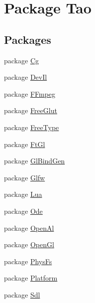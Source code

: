 \hypertarget{namespace_tao}{
\section{Package Tao}
\label{namespace_tao}
}
\subsection*{Packages}
\begin{DoxyCompactItemize}
\item 
package \hyperlink{namespace_tao_1_1_cg}{Cg}
\item 
package \hyperlink{namespace_tao_1_1_dev_il}{DevIl}
\item 
package \hyperlink{namespace_tao_1_1_f_fmpeg}{FFmpeg}
\item 
package \hyperlink{namespace_tao_1_1_free_glut}{FreeGlut}
\item 
package \hyperlink{namespace_tao_1_1_free_type}{FreeType}
\item 
package \hyperlink{namespace_tao_1_1_ft_gl}{FtGl}
\item 
package \hyperlink{namespace_tao_1_1_gl_bind_gen}{GlBindGen}
\item 
package \hyperlink{namespace_tao_1_1_glfw}{Glfw}
\item 
package \hyperlink{namespace_tao_1_1_lua}{Lua}
\item 
package \hyperlink{namespace_tao_1_1_ode}{Ode}
\item 
package \hyperlink{namespace_tao_1_1_open_al}{OpenAl}
\item 
package \hyperlink{namespace_tao_1_1_open_gl}{OpenGl}
\item 
package \hyperlink{namespace_tao_1_1_phys_fs}{PhysFs}
\item 
package \hyperlink{namespace_tao_1_1_platform}{Platform}
\item 
package \hyperlink{namespace_tao_1_1_sdl}{Sdl}
\end{DoxyCompactItemize}
